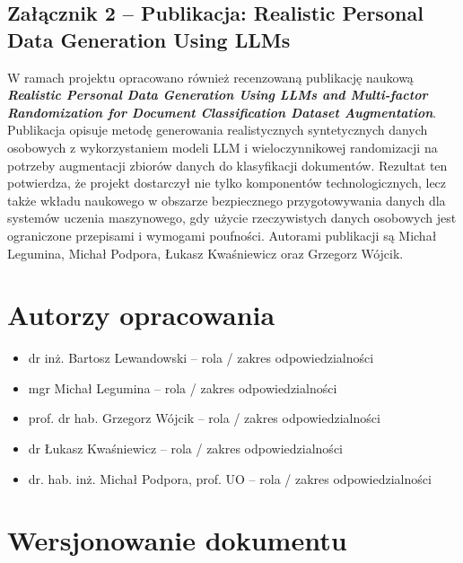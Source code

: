 \documentclass[12pt,a4paper]{report}
\begin{document}


\section*{Załącznik 2 -- Publikacja: Realistic Personal Data Generation Using LLMs}

W ramach projektu opracowano również recenzowaną publikację naukową \textit{\textbf{Realistic Personal Data Generation Using LLMs and Multi-factor Randomization for Document Classification Dataset Augmentation}}. Publikacja opisuje metodę generowania realistycznych syntetycznych danych osobowych z wykorzystaniem modeli LLM i wieloczynnikowej randomizacji na potrzeby augmentacji zbiorów danych do klasyfikacji dokumentów. Rezultat ten potwierdza, że projekt dostarczył nie tylko komponentów technologicznych, lecz także wkładu naukowego w obszarze bezpiecznego przygotowywania danych dla systemów uczenia maszynowego, gdy użycie rzeczywistych danych osobowych jest ograniczone przepisami i wymogami poufności. Autorami publikacji są Michał Legumina, Michał Podpora, Łukasz Kwaśniewicz oraz Grzegorz Wójcik.




\chapter*{Autorzy opracowania}

\begin{itemize}
    \item dr inż. Bartosz Lewandowski -- rola / zakres odpowiedzialności
    \item mgr Michał Legumina -- rola / zakres odpowiedzialności
    \item prof. dr hab. Grzegorz Wójcik -- rola / zakres odpowiedzialności
    \item dr Łukasz Kwaśniewicz -- rola / zakres odpowiedzialności
    \item dr. hab. inż. Michał Podpora, prof. UO -- rola / zakres odpowiedzialności
\end{itemize}

\chapter*{Wersjonowanie dokumentu}
\end{document}
